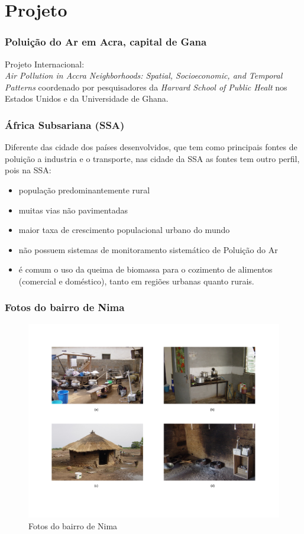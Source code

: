 \section{Projeto}

\begin{frame}
  \frametitle{Poluição do Ar em Acra, capital de Gana}
  Projeto Internacional: \\
  \textit{Air Pollution in Accra Neighborhoods: Spatial, Socioeconomic, and Temporal Patterns} 
  coordenado por pesquisadores da \textit{Harvard School of Public Healt} nos Estados Unidos
  e da Universidade de Ghana.
\end{frame}

\begin{frame}
 \frametitle{ África Subsariana (SSA)}
  Diferente das cidade dos países desenvolvidos, que tem como principais fontes de poluição 
  a industria e o transporte, nas cidade da SSA as fontes tem outro perfil, pois na SSA:
  \begin{itemize}
    \item população predominantemente rural
    \item muitas vias não pavimentadas
    \item maior taxa de crescimento populacional urbano do mundo
    \item não possuem sistemas de monitoramento sistemático de Poluição do Ar
    \item é comum o uso da queima de biomassa para o cozimento de alimentos (comercial e doméstico), tanto em regiões urbanas quanto rurais.
  \end{itemize}
\end{frame}

\begin{frame}
  \frametitle{Fotos do bairro de Nima}
  \begin{figure}[H]
    \centering
    \caption{Fotos do bairro de Nima}
    \includegraphics[scale=0.35]{../../../inputs/zheng_images/nima.pdf}
  \end{figure}
\end{frame}

